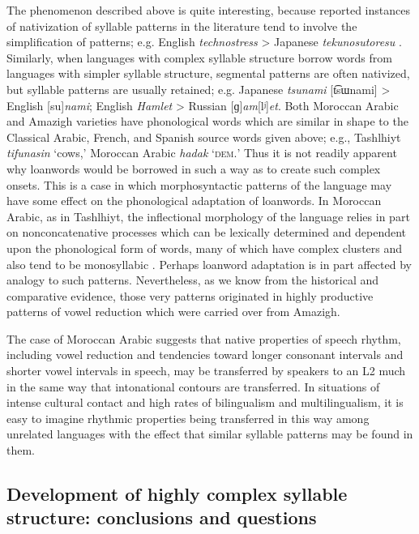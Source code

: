   The phenomenon described above is quite interesting, because reported instances of nativization of syllable patterns in the literature tend to involve the simplification of patterns; e.g. English \textit{technostress} > Japanese \textit{tekunosutoresu} \citep[69]{Kay1995}. Similarly, when languages with complex syllable structure borrow words from languages with simpler syllable structure, segmental patterns are often nativized, but syllable patterns are usually retained; e.g. Japanese \textit{tsunami} [t͡sɯnami] > English [su]\textit{nami}; English \textit{Hamlet} > Russian [ɡ]\textit{am}[lʲ]\textit{et}. Both Moroccan Arabic and Amazigh varieties have phonological words which are similar in shape to the Classical Arabic, French, and Spanish source words given above; e.g., Tashlhiyt \textit{tifunasin} ‘cows,’ Moroccan Arabic \textit{hadak} ‘\textsc{dem.}’ Thus it is not readily apparent why loanwords would be borrowed in such a way as to create such complex onsets. This is a case in which morphosyntactic patterns of the language may have some effect on the phonological adaptation of loanwords. In Moroccan Arabic, as in Tashlhiyt, the inflectional morphology of the language relies in part on nonconcatenative processes which can be lexically determined and dependent upon the phonological form of words, many of which have complex clusters and also tend to be monosyllabic \citep{Heath2007}. Perhaps loanword adaptation is in part affected by analogy to such patterns. Nevertheless, as we know from the historical and comparative evidence, those very patterns originated in highly productive patterns of vowel reduction which were carried over from Amazigh.

  The case of Moroccan Arabic suggests that native properties of speech rhythm, including vowel reduction and tendencies toward longer consonant intervals and shorter vowel intervals in speech, may be transferred by speakers to an L2 much in the same way that intonational contours are transferred. In situations of intense cultural contact and high rates of bilingualism and multilingualism, it is easy to imagine rhythmic properties being transferred in this way among unrelated languages with the effect that similar syllable patterns may be found in them.

\subsection{Development of highly complex syllable structure: conclusions and questions}\label{sec:8.4.6}

